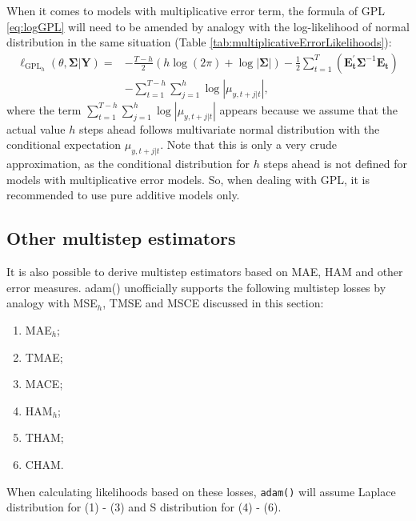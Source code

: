 \documentclass[
]{book}
\providecommand{\tightlist}{%
  \setlength{\itemsep}{0pt}\setlength{\parskip}{0pt}}
\theoremstyle{definition}
\theoremstyle{definition}
\theoremstyle{definition}
\theoremstyle{definition}
\theoremstyle{remark}
\begin{document}
When it comes to models with multiplicative error term, the formula of GPL \eqref{eq:logGPL} will need to be amended by analogy with the log-likelihood of normal distribution in the same situation (Table \ref{tab:multiplicativeErrorLikelihoods}):
\begin{equation}
    \begin{aligned}
    \ell_{\mathrm{GPL}_h}(\theta, \mathbf{{\Sigma}} | \mathbf{Y}) = & -\frac{T-h}{2} \left( h \log(2 \pi) + \log | \mathbf{{\Sigma}}| \right) -\frac{1}{2} \sum_{t=1}^T \left( \mathbf{E_t^\prime} \mathbf{{\Sigma}}^{-1} \mathbf{E_t} \right) \\
                        & - \sum_{t=1}^{T-h} \sum_{j=1}^h \log |\mu_{y,t+j|t}|,
    \end{aligned}
  \label{eq:logGPLMultiplicative}
\end{equation}
where the term \(\sum_{t=1}^{T-h} \sum_{j=1}^h \log |\mu_{y,t+j|t}|\) appears because we assume that the actual value \(h\) steps ahead follows multivariate normal distribution with the conditional expectation \(\mu_{y,t+j|t}\). Note that this is only a very crude approximation, as the conditional distribution for \(h\) steps ahead is not defined for models with multiplicative error models. So, when dealing with GPL, it is recommended to use pure additive models only.

\hypertarget{other-multistep-estimators}{%
\subsection{Other multistep estimators}\label{other-multistep-estimators}}

It is also possible to derive multistep estimators based on MAE, HAM and other error measures. adam() unofficially supports the following multistep losses by analogy with MSE\(_h\), TMSE and MSCE discussed in this section:

\begin{enumerate}
\def\labelenumi{\arabic{enumi}.}
\tightlist
\item
  MAE\(_h\);
\item
  TMAE;
\item
  MACE;
\item
  HAM\(_h\);
\item
  THAM;
\item
  CHAM.
\end{enumerate}

When calculating likelihoods based on these losses, \texttt{adam()} will assume Laplace distribution for (1) - (3) and S distribution for (4) - (6).
\end{document}
